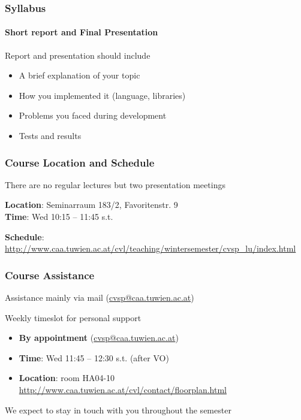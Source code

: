 \documentclass[xetex,professionalfont]{beamer}
\begin{document}

\begin{frame}
\frametitle{Syllabus}
\framesubtitle{Short report and Final Presentation}

Report and presentation should include
\begin{itemize} 
	\item A brief explanation of your topic
	\item How you implemented it (language, libraries)
	\item Problems you faced during development
	\item Tests and results
\end{itemize}

\end{frame}


\begin{frame}
\frametitle{Course Location and Schedule}

There are no regular lectures but two presentation meetings

\bigskip
\textbf{Location}: Seminarraum 183/2, Favoritenstr. 9\\
\textbf{Time}: Wed 10:15 -- 11:45 s.t.

\bigskip
\textbf{Schedule}: \url{http://www.caa.tuwien.ac.at/cvl/teaching/wintersemester/cvsp_lu/index.html}

\end{frame}


\begin{frame}
\frametitle{Course Assistance}

Assistance mainly via mail (\url{cvsp@caa.tuwien.ac.at})

\bigskip
Weekly timeslot for personal support
\begin{itemize}
	\item \textbf{By appointment} (\url{cvsp@caa.tuwien.ac.at})
	\item \textbf{Time}: Wed 11:45 -- 12:30 s.t. (after VO)
	\item \textbf{Location}: room HA04-10 \scriptsize\url{http://www.caa.tuwien.ac.at/cvl/contact/floorplan.html}\normalsize
\end{itemize}

\bigskip
We expect to stay in touch with you throughout the semester

\end{frame}
\end{document}

